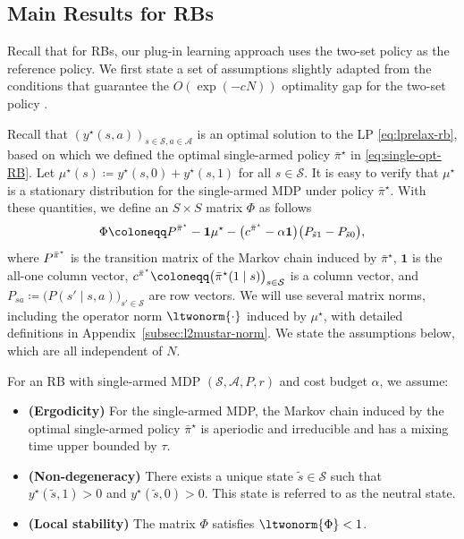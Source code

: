 \documentclass[mnsc,nonblindrev]{informs3}
\newcommand{\one}{\mathbf{1}}
\newcommand{\pibst}{\Bar{\pi}^\star}
\begin{document}
\subsection{Main Results for RBs}
Recall that for RBs, our plug-in learning approach uses the two-set policy as the reference policy.
We first state a set of assumptions slightly adapted from the conditions that guarantee the $O(\exp(-cN))$ optimality gap for the two-set policy \citep{hong2024achieving}.

Recall that $(y^\star(s,a))_{s\in\mathcal S,a\in\mathcal A}$ is an optimal solution to the LP \eqref{eq:lprelax-rb}, based on which we defined the optimal single-armed policy $\bar\pi^\star$ in \eqref{eq:single-opt-RB}. Let $\mu^\star(s) \coloneqq y^\star(s, 0) + y^\star(s, 1)$ for all $s\in\mathcal{S}$.
It is easy to verify that $\mu^\star$ is a stationary distribution for the single-armed MDP under policy $\bar\pi^\star$.
With these quantities, we define an $S\times S$ matrix $\Phi$ as follows
\vspace{-0.05cm}\begin{equation}\label{def:phi}
\Phi \coloneqq P^{\pibst}-\one \mu^\star
-\bigl(c^{\pibst}-\alpha\mathbf 1\bigr)\bigl(P_{\tilde{s}1}-P_{\tilde{s}0}\bigr),
\end{equation}
where $P^{\pibst}$ is the transition matrix of the Markov chain induced by $\bar\pi^\star$, $\one$ is the all-one column vector,
$c^{\pibst}\coloneqq\bigl(\bar\pi^\star(1\mid s)\bigr)_{s\in\mathcal S}$ is a column vector, 
and $P_{sa}\coloneqq \bigl(P(s'\mid s,a)\bigr)_{s'\in\mathcal{S}}$ are
row vectors. 
We will use several matrix norms, including the operator norm $\ltwonorm{\cdot}$ induced by $\mu^\star$, with detailed definitions in Appendix~\ref{subsec:l2mustar-norm}. 
We state the assumptions below, which are all independent of $N$.
\begin{assumption}\label{ass:RB}
For an RB with single-armed MDP $(\mathcal{S},\mathcal{A},P,r)$ and cost budget $\alpha$, we assume:
\begin{itemize}[leftmargin=1.5em,itemsep=-3pt,topsep=1pt]
    \item \textbf{(Ergodicity)} For the single-armed MDP, the Markov chain induced by the optimal single-armed policy $\bar\pi^\star$ is aperiodic and irreducible and has a mixing time upper bounded by $\tau$.
    \item \textbf{(Non-degeneracy)} There exists a unique state $\tilde s\in\mathcal S$ such that $y^\star(\tilde s,1)>0$ and $y^\star(\tilde s,0)>0$. This state is referred to as the neutral state.
    \item \textbf{(Local stability)}
    The matrix $\Phi$ satisfies $\ltwonorm{\Phi}< 1$.
\end{itemize}
\end{assumption}
\end{document}
